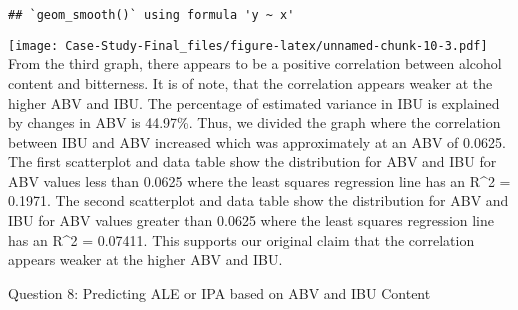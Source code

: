 \documentclass[
]{article}
\begin{document}
\begin{verbatim}
## `geom_smooth()` using formula 'y ~ x'
\end{verbatim}

\texttt{[image: Case-Study-Final\_files/figure-latex/unnamed-chunk-10-3.pdf]}
From the third graph, there appears to be a positive correlation between
alcohol content and bitterness. It is of note, that the correlation
appears weaker at the higher ABV and IBU. The percentage of estimated
variance in IBU is explained by changes in ABV is 44.97\%. Thus, we
divided the graph where the correlation between IBU and ABV increased
which was approximately at an ABV of 0.0625. The first scatterplot and
data table show the distribution for ABV and IBU for ABV values less
than 0.0625 where the least squares regression line has an R\^{}2 =
0.1971. The second scatterplot and data table show the distribution for
ABV and IBU for ABV values greater than 0.0625 where the least squares
regression line has an R\^{}2 = 0.07411. This supports our original
claim that the correlation appears weaker at the higher ABV and IBU.

Question 8: Predicting ALE or IPA based on ABV and IBU Content
\end{document}
